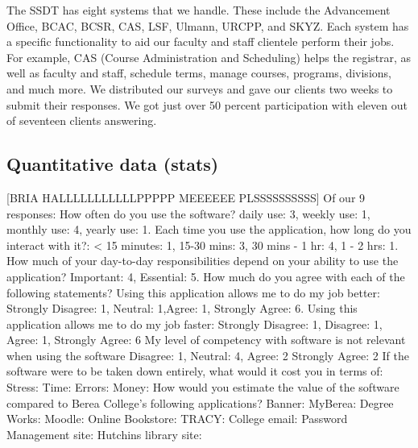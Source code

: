 The SSDT has eight systems that we handle. These include the Advancement Office, BCAC, BCSR, CAS, LSF, Ulmann, URCPP, and SKYZ. Each system has a specific functionality to aid our faculty and staff clientele perform their jobs. For example, CAS (Course Administration and Scheduling) helps the registrar, as well as faculty and staff, schedule terms, manage courses, programs, divisions, and much more.
We distributed our surveys and gave our clients two weeks to submit their responses. We got just over 50 percent participation with eleven out of seventeen clients answering.

\subsection{Quantitative data (stats)}
[BRIA HALLLLLLLLLLLPPPPP MEEEEEE PLSSSSSSSSSS]
Of our 9 responses: %
How often do you use the software? daily use: 3, weekly use: 1, monthly use: 4, yearly use: 1.
Each time you use the  application, how long do you interact with it?: < 15 minutes: 1, 15-30 mins: 3, 30 mins - 1 hr: 4, 1 - 2 hrs: 1.
How much of your day-to-day responsibilities depend on your ability to use the  application? Important: 4, Essential: 5.
How much do you agree with each of the following statements?
Using this application allows me to do my job better: Strongly Disagree: 1, Neutral: 1,Agree: 1, Strongly Agree: 6.
Using this application allows me to do my job faster: Strongly Disagree: 1, Disagree: 1, Agree: 1, Strongly Agree: 6
My level of competency with software is not relevant when using the software Disagree: 1, Neutral: 4, Agree: 2 Strongly Agree: 2
If the software were to be taken down entirely, what would it cost you in terms of:
Stress:
Time:
Errors:
Money:
How would you estimate the value of the software compared to Berea College's following applications?
Banner:
MyBerea:
Degree Works:
Moodle:
Online Bookstore:
TRACY:
College email:
Password Management site:
Hutchins library site:
